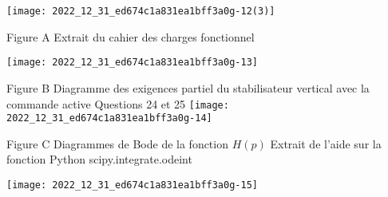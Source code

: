\begin{center}
\texttt{[image: 2022\_12\_31\_ed674c1a831ea1bff3a0g-12(3)]}
\end{center}

Figure A Extrait du cahier des charges fonctionnel

\begin{center}
\texttt{[image: 2022\_12\_31\_ed674c1a831ea1bff3a0g-13]}
\end{center}

Figure B Diagramme des exigences partiel du stabilisateur vertical avec la commande active Questions 24 et 25
\texttt{[image: 2022\_12\_31\_ed674c1a831ea1bff3a0g-14]}

Figure C Diagrammes de Bode de la fonction $H(p)$ Extrait de l'aide sur la fonction Python scipy.integrate.odeint

\begin{center}
\texttt{[image: 2022\_12\_31\_ed674c1a831ea1bff3a0g-15]}
\end{center}

